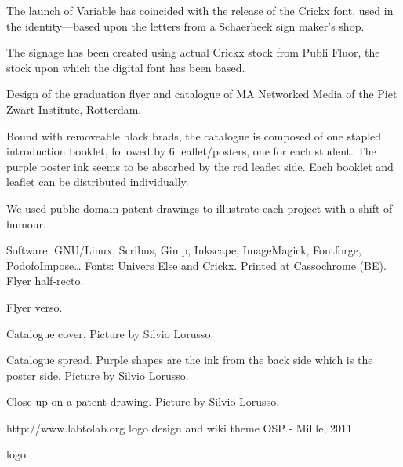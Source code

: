 The launch of Variable has coincided with the release of the Crickx
font, used in the identity---based upon the letters from a Schaerbeek
sign maker's shop.

The signage has been created using actual Crickx stock from Publi Fluor,
the stock upon which the digital font has been based.

{}
{}
{} {}







\subject{PZI CATALOGUE 2011}

Design of the graduation flyer and catalogue of MA Networked Media of
the Piet Zwart Institute, Rotterdam.

Bound with removeable black brads, the catalogue is composed of one
stapled introduction booklet, followed by 6 leaflet/posters, one for
each student. The purple poster ink seems to be absorbed by the red
leaflet side. Each booklet and leaflet can be distributed individually.

We used public domain patent drawings to illustrate each project with a
shift of humour.

\thinrule

Software: GNU/Linux, Scribus, Gimp, Inkscape, ImageMagick, Fontforge,
PodofoImpose\ldots{} Fonts: Univers Else and Crickx. Printed at
Cassochrome (BE). {} Flyer half-recto.

{} Flyer verso.

{} Catalogue cover. Picture by Silvio Lorusso.

{} Catalogue spread. Purple shapes are the
 ink from the back side which is the poster side.
Picture by Silvio Lorusso.

{} Close-up on a patent drawing. Picture by
Silvio Lorusso.






\subject{LABtoLAB}


http://www.labtolab.org logo design and wiki theme OSP - Millle, 2011

{} logo

